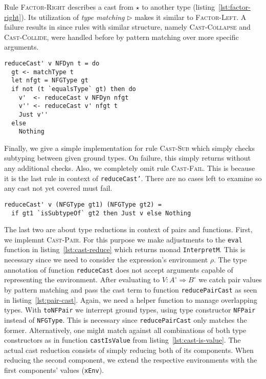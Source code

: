 Rule \textsc{Factor-Right} describes a cast from $\star$ to another type (listing~\ref{lst:factor-right}). Its utilization of \emph{type matching} $\rhd$ makes it similar to \textsc{Factor-Left}. A failure results in \blame since rules with similar structure, namely \textsc{Cast-Collapse} and \textsc{Cast-Collide}, were handled before by pattern matching over more specific arguments.

\begin{lstlisting}[float,
  caption=Rule \textsc{Factor-Right} (\texttt{Interpreter.hs}),
  label=lst:factor-right]
reduceCast' v NFDyn t = do
  gt <- matchType t
  let nfgt = NFGType gt
  if not (t `equalsType` gt) then do
    v'  <- reduceCast v NFDyn nfgt
    v'' <- reduceCast v' nfgt t
    Just v''
  else
    Nothing
\end{lstlisting}

Finally, we give a simple implementation for rule \textsc{Cast-Sub} which simply checks subtyping between given ground types. On failure, this simply returns \blame without any additional checks. Also, we completely omit rule \textsc{Cast-Fail}. This is because it is the last rule in context of \texttt{reduceCast'}. There are no cases left to examine so any cast not yet covered must fail.

\begin{lstlisting}[caption=Rule \textsc{Cast-Sub} (\texttt{Interpreter.hs})]
reduceCast' v (NFGType gt1) (NFGType gt2) =
  if gt1 `isSubtypeOf` gt2 then Just v else Nothing
\end{lstlisting}

The last two are about type reductions in context of pairs and functions. First, we implemnt \textsc{Cast-Pair}. For this purpose we make adjustments to the \texttt{eval} function in listing~\ref{lst:cast-reduce} which returns monad \texttt{InterpretM}. This is necessary since we need to consider the expression's environment $\rho$. The type annotation of function \texttt{reduceCast} does not accept arguments capable of representing the environment. After evaluating to $V : A^\circ \Rightarrow B^\circ$ we catch pair values by pattern matching and pass the cast term to function \texttt{reducePairCast} as seen in listing~\ref{lst:pair-cast}. Again, we need a helper function to manage overlapping types. With \texttt{toNFPair} we interrept ground types, using type constructor \texttt{NFPair} instead of \texttt{NFGType}. This is necessary since \texttt{reducePairCast} only matches the former. Alternatively, one might match against all combinations of both type constructors as in function \texttt{castIsValue} from listing~\ref{lst:cast-is-value}. The actual cast reduction consists of simply reducing both of its components. When reducing the second component, we extend the respective environments with the first components' values (\texttt{xEnv}).


